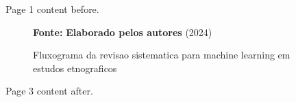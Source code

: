 \documentclass[brazil,msc]{ppgpi-abntex2}
\newcommand{\fonte}[1]{\par\small\textbf{Fonte:} #1}
\begin{document}
Page 1 content before.
\begin{landscape}
\newbox\testbox
\savebox\testbox{}
\begin{figure}[H]
  \centering
  \caption{Fluxograma da revisao sistematica para machine learning em estudos etnograficos}
  \fonte{\textbf{Elaborado pelos autores} (2024)}
  \label{fig:test3}
\end{figure}
\end{landscape}
Page 3 content after.
\end{document}
